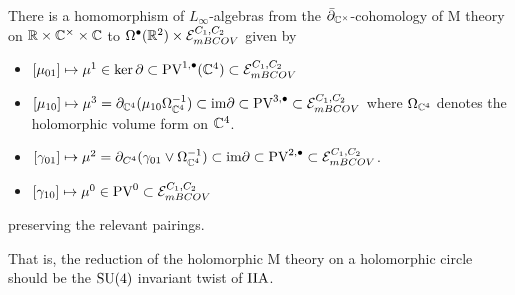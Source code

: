 \documentclass[11pt]{article}
\begin{document}
\begin{prop}
There is a homomorphism of $L_\infty$-algebras from the $\bar{\partial}_{\mathbb{C}^\times}$-cohomology of M theory on $\mathbb{R}\times\mathbb{C}^\times\times\mathbb{C}$ to $\Omega^\bullet(\mathbb{R}^2)\times\mathcal{E}_{mBCOV}^{C_1,C_2}$ given by 
\begin{itemize}
\item $[\mu_{01}]\mapsto\mu^1\in\ker\partial\subset\text{PV}^{1,\bullet}(\mathbb{C}^4)\subset\mathcal{E}_{mBCOV}^{C_1,C_2}$
\item $[\mu_{10}]\mapsto\mu^3 =\partial_{\mathbb{C}^4}(\mu_{10}\Omega^{-1}_{\mathbb{C}^4})\subset\text{im}\partial\subset\text{PV}^{3,\bullet}\subset\mathcal{E}_{mBCOV}^{C_1,C_2}$ where $\Omega_{\mathbb{C}^4}$ denotes the holomorphic volume form on $\mathbb{C}^4$.
\item $[\gamma_{01}]\mapsto\mu^2 = \partial_{C^4}(\gamma_{01}\vee\Omega^{-1}_{\mathbb{C}^4})\subset\text{im}\partial\subset\text{PV}^{2,\bullet}\subset\mathcal{E}_{mBCOV}^{C_1,C_2}$.
\item $[\gamma_{10}]\mapsto\mu^0\in\text{PV}^0\subset\mathcal{E}_{mBCOV}^{C_1,C_2}$
\end{itemize}
preserving the relevant pairings.
\end{prop}

That is, the reduction of the holomorphic M theory on a holomorphic circle should be the $\text{SU}(4)$ invariant twist of $\text{IIA}$. 
\end{document}
